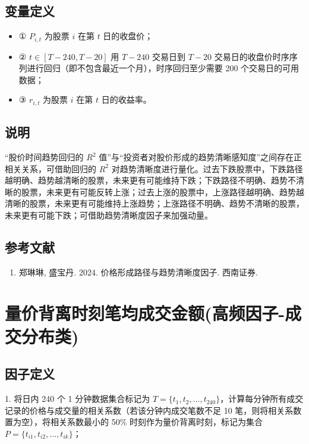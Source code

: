 \documentclass{article}
\begin{document}
\subsection{变量定义}
\begin{itemize}
    \item ① \( P_{i,t} \) 为股票 \( i \) 在第 \( t \) 日的收盘价；
    \item ② \( t \in [T-240, T-20] \) 用 \( T-240 \) 交易日到 \( T-20 \) 交易日的收盘价时序序列进行回归（即不包含最近一个月），时序回归至少需要 200 个交易日的可用数据；
    \item ③ \( r_{i,t} \) 为股票 \( i \) 在第 \( t \) 日的收益率。
\end{itemize}

\subsection{说明}
“股价时间趋势回归的 \( R^2 \) 值”与“投资者对股价形成的趋势清晰感知度”之间存在正相关关系，可借助回归的 \( R^2 \) 对趋势清晰度进行量化。过去下跌股票中，下跌路径越明确、趋势越清晰的股票，未来更有可能维持下跌；下跌路径不明确、趋势不清晰的股票，未来更有可能反转上涨；过去上涨的股票中，上涨路径越明确、趋势越清晰的股票，未来更有可能维持上涨趋势；上涨路径不明确、趋势不清晰的股票，未来更有可能下跌；可借助趋势清晰度因子来加强动量。

\subsection{参考文献}
\begin{enumerate}
    \item 郑琳琳, 盛宝丹. 2024. 价格形成路径与趋势清晰度因子. 西南证券.
\end{enumerate}

\section{量价背离时刻笔均成交金额(高频因子-成交分布类)}

\subsection{因子定义}

1. 将日内 240 个 1 分钟数据集合标记为 \( T = \{t_1, t_2, \dots, t_{240}\} \)，计算每分钟所有成交记录的价格与成交量的相关系数（若该分钟内成交笔数不足 10 笔，则将相关系数置为空），将相关系数最小的 50\% 时刻作为量价背离时刻，标记为集合 \( P = \{t_{i1}, t_{i2}, \dots, t_{ik}\} \)；
\end{document}
